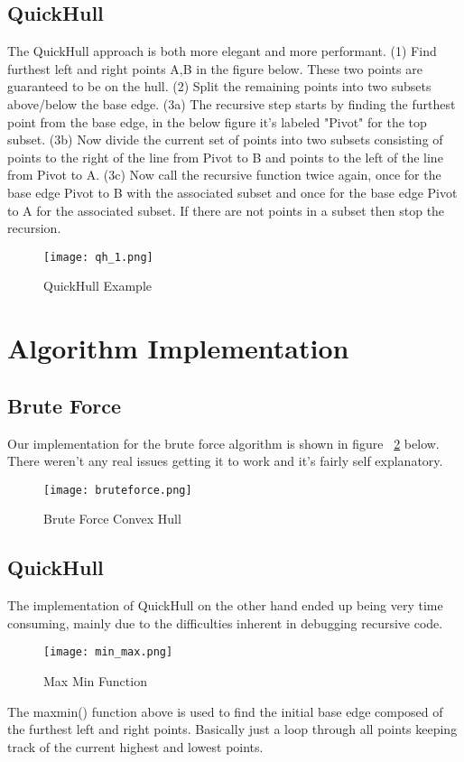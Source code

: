 \documentclass[a4paper, 12pt]{article}
\begin{document}
{  \subsection{QuickHull}
  The QuickHull approach is both more elegant and more performant. (1) Find furthest left and right points A,B in the figure below. These two points are guaranteed to be on the hull.  (2) Split the remaining points into two subsets above/below the base edge. (3a) The recursive step starts by finding the furthest point from the base edge, in the below figure it's labeled "Pivot" for the top subset. (3b) Now divide the current set of points into two subsets consisting of points to the right of the line from Pivot to B and points to the left of the line from Pivot to A. (3c) Now call the recursive function twice again, once for the base edge Pivot to B with the associated subset and once for the base edge Pivot to A for the associated subset. If there are not points in a subset then stop the recursion. 
  \begin{figure}[H]
  \begin{center}
    \texttt{[image: qh\_1.png]}
\end{center}
\caption{QuickHull Example}
    \label{fig:qh_1}
  \end{figure} 
  \section{Algorithm Implementation}
  \subsection{Brute Force}

  Our implementation for the brute force algorithm is shown in figure ~\ref{fig:bruteforce} below. There weren't any real issues getting it to work and it's fairly self explanatory.
  \begin{figure}[H]
  \begin{center}
    \texttt{[image: bruteforce.png]}
\end{center}
    \caption{Brute Force Convex Hull}
    \label{fig:bruteforce}
  \end{figure} 
  \subsection{QuickHull}
 The implementation of QuickHull on the other hand ended up being very time consuming, mainly due to the difficulties inherent in debugging recursive code.  
  \begin{figure}[H]
  \begin{center}
    \texttt{[image: min\_max.png]}
  \end{center}
    \caption{Max Min Function}
    \label{fig:min_max}
  \end{figure} 
  The maxmin() function above is used to find the initial base edge composed of the furthest left and right points. Basically just a loop through all points keeping track of the current highest and lowest points. 

}
\end{document}
